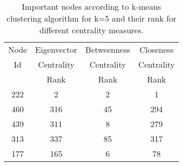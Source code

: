 
\begin{table}[th]
\small
\centering
\begin{tabular}{ |c|c|c|c| }
\hline
Node&	Eigenvector& Betweenness& Closeness\\
Id&	Centrality& Centrality& Centrality\\
&	Rank&	Rank&	Rank\\ \hline
222&	2&	2&	1\\ \hline
460&	316&	45&	294\\ \hline
439&	311&	8&	279\\ \hline
313&	337&	85&	317\\ \hline
177&	165&	6&	78\\ \hline
\end{tabular}
\caption{\capfont Important nodes according to k-means clustering
algorithm for k=5 and their rank for different centrality measures.}
\label{tab:k-means-results}
\end{table}

